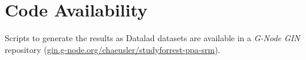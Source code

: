 \section*{Code Availability}

Scripts to generate the results as Datalad \citep{halchenko2021datalad} datasets
are available in a \emph{G-Node GIN} repository
(\href{https://gin.g-node.org/chaeusler/studyforrest-ppa-srm}{\url{gin.g-node.org/chaeusler/studyforrest-ppa-srm}}).


\begin{comment}


\pagebreak

\section{Backup of texts}

\subsection{Localizer generalizes amazingly well}

\todo[inline]{in general, I think this does not need to be discussed; still,
here are some ideas}

\todo[inline]{Haxby claims: dedicated paradigms do not generalize well}

\todo[inline]{But their BSC of movie segments based on localizer \ac{cfs} is
"more difficult" than our case}

\todo[inline]{Raider movie: 1,700 TRs}

\todo[inline]{Haxby's localizer: 1,536 TRs; 1.7 TRs per pic (896 pics shown)}

\todo[inline]{Haxby's animals: 1,640 TRs; 1.4 TRs per pic (1140 pics shown)}

\todo[inline]{our localizer: 624 TRs; 1.6 TRs per pic (384 pics shown)}

\todo[inline]{is our multi-paradigm model so good? or is it the matrices? or is
our test (estimating $Z$-maps instead of BSC of movie segments) easier?}

\paragraph{Haxby templates}

%
``Our previous results showed that the sampling of response vectors from
simpler, controlled experiments is impoverished and produces a model
representational space that does not generalize well to new stimuli in other
experiments \citep{haxby2020hyperalignment}'' \citep{guntupalli2016model}.


\end{comment}
